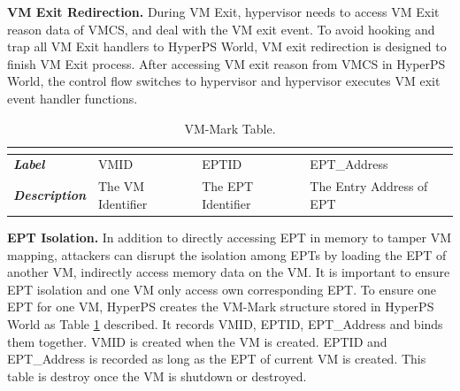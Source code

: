 \documentclass[conference]{IEEEtran}
\begin{document}
\textbf{VM Exit Redirection.}
During VM Exit, hypervisor needs to access VM Exit reason data of VMCS, and deal with the VM exit event.
 To avoid hooking and trap all VM Exit handlers to HyperPS World, VM exit redirection is designed to finish VM Exit process. After accessing VM exit reason from VMCS in HyperPS World, the control flow switches to hypervisor and hypervisor executes VM exit event handler functions.


\begin{table}[htbp]
\centering
\caption{VM-Mark Table.}\label{tab1}
\begin{tabular}{p{1.4cm}|p{1.2cm}|p{1.1cm}|p{1.7cm}}
\hline
\multicolumn{4}{c}{\bfseries\textbf\centering{VM-Mark Table}}\\
\hline
{\itshape\bfseries Label} & VMID & EPTID & EPT\_Address\\
\hline
{\itshape\bfseries Description} & { The VM Identifier} & The EPT Identifier & The Entry Address of EPT\\
\hline
\end{tabular}
\end{table}



\textbf{EPT Isolation.}
In addition to directly accessing EPT in memory to tamper VM mapping, attackers can disrupt the isolation among EPTs by loading the EPT of another VM, indirectly access memory data on the VM.
 It is important to ensure EPT isolation and one VM only access own corresponding EPT.
To ensure one EPT for one VM, HyperPS creates the VM-Mark structure stored in HyperPS World as Table \ref{tab1} described. It records VMID, EPTID, EPT\_Address and binds them together. VMID is created when the VM is created. 
 EPTID and EPT\_Address is recorded as long as the EPT of current VM is created. This table is destroy once the  VM is shutdown or destroyed.
\end{document}

